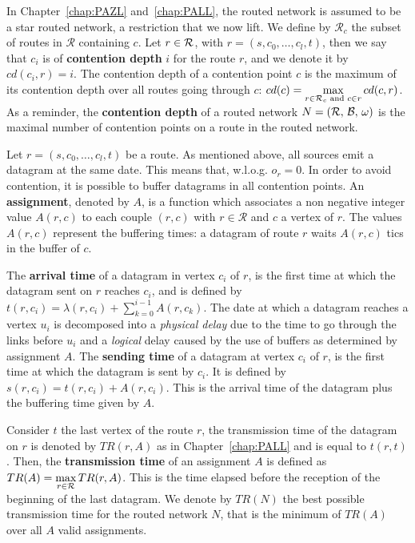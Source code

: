 In Chapter~\ref{chap:PAZL} and~\ref{chap:PALL}, the routed network is assumed to be a star routed network, a restriction that we now lift.
We define by $\mathcal{R}_c$ the subset of routes in $\mathcal{R}$ containing $c$. Let $r \in {\cal R}$, with $r = (s,c_0,\dots,c_l,t)$, then we say that $c_i$ is of \textbf{contention depth} $i$ for the route $r$, and we denote it by $cd(c_i,r) = i$. The contention depth of a contention point $c$ is the maximum of its contention depth over all routes going through $c$: $cd(c) = \max\limits_{r\in{\cal R}_c \text{ and } c \in r} cd(c,r)$. 
As a reminder, the \textbf{contention depth} of a routed network $N = ({\cal R},\,{\cal B},\,\omega)$ is the maximal number of contention points on a route in the routed network. 


   Let $r=(s,c_0,\dots,c_l,t)$ be a route. As mentioned above, all sources emit a datagram at the same date. This means that, w.l.o.g. $o_r = 0$. In order to avoid contention, it is possible to buffer datagrams in all contention points. An \textbf{assignment}, denoted by  $A$, is a function which associates a non negative integer value $A(r,c)$ to each couple $(r,c)$ with $r \in \mathcal{R}$ and $c$ a vertex of $r$. The values $A(r,c)$ represent the buffering times: a datagram of route $r$ waits $A(r,c)$ tics in the buffer of $c$.
          
       

 The \textbf{arrival time} of a datagram in vertex $c_i$ of $r$, is the first time at which the datagram sent on $r$ reaches $c_i$, and is defined by $t(r,c_i) = \lambda(r,c_i) + \sum_{k=0}^{i-1} A(r,c_k) $. The date at which a datagram reaches a vertex $u_i$ is decomposed into a \emph{physical delay} due to the time to go through the links before $u_i$ and a \emph{logical} delay caused by the use of buffers as determined by assignment $A$.
  The \textbf{sending time} of a datagram at vertex $c_i$ of $r$, is the first time at which the datagram is sent by $c_i$. It is defined by $s(r,c_i) = t(r,c_i) +  A(r,c_i) $. This is the arrival time of the datagram plus the buffering time given by $A$.
 
  Consider $t$ the last vertex of the route $r$, the transmission time of the datagram on 
  $r$ is denoted by $TR(r,A)$ as in Chapter~\ref{chap:PALL} and is equal to $t(r,t)$. Then, the \textbf{transmission time} of an assignment $A$ is defined as $TR(A) = \displaystyle \max\limits_{r \in {\cal R}} TR(r,A) $. This is the time elapsed before the reception of the beginning of the last datagram. We denote by $TR(N)$ the best possible transmission time for the routed network $N$, that is the minimum of $TR(A)$ over all $A$ valid assignments.


